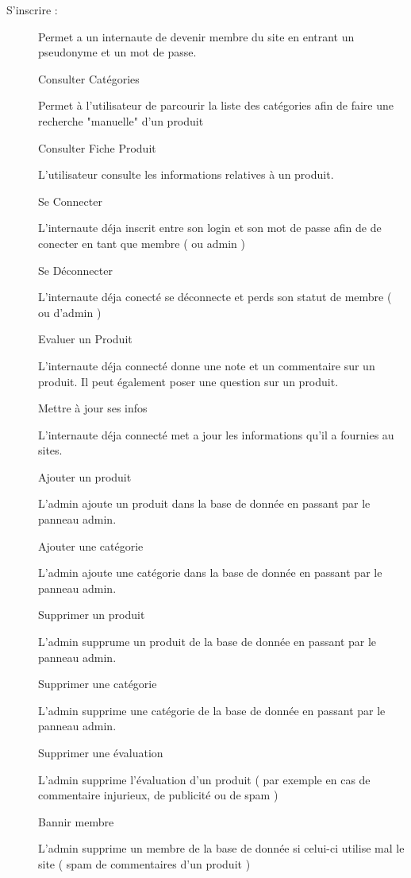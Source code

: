 \begin{description}
\item[S'inscrire : ]	
Permet a un internaute de devenir membre du site en entrant un pseudonyme et un mot de passe.

	Consulter Catégories
	
Permet à l'utilisateur de parcourir la liste des catégories afin de faire une recherche "manuelle" d'un produit
	
	Consulter Fiche Produit
	
L'utilisateur consulte les informations relatives à un produit.
	
	Se Connecter
	
L'internaute déja inscrit entre son login et son mot de passe afin de de conecter en tant que membre ( ou admin )
	
	Se Déconnecter
	
L'internaute déja conecté se déconnecte et perds son statut de membre ( ou d'admin )
	
	Evaluer un Produit
	
L'internaute déja connecté donne une note et un commentaire sur un produit. Il peut également poser une question sur un produit.
	
	Mettre à jour ses infos
	
L'internaute déja connecté met a jour les informations qu'il a fournies au sites.
	
	Ajouter un produit
	
L'admin ajoute un produit dans la base de donnée en passant par le panneau admin.
	
	Ajouter une catégorie
	
L'admin ajoute une catégorie dans la base de donnée en passant par le panneau admin.
	
	Supprimer un produit
	
L'admin supprume un produit de la base de donnée en passant par le panneau admin.
	
	Supprimer une catégorie
	
L'admin supprime une catégorie de la base de donnée en passant par le panneau admin.

	Supprimer une évaluation
	
L'admin supprime l'évaluation d'un produit ( par exemple en cas de commentaire injurieux, de publicité ou de spam )
	
	Bannir membre
	
L'admin supprime un membre de la base de donnée si celui-ci utilise mal le site ( spam de commentaires d'un produit )

\end{description}
